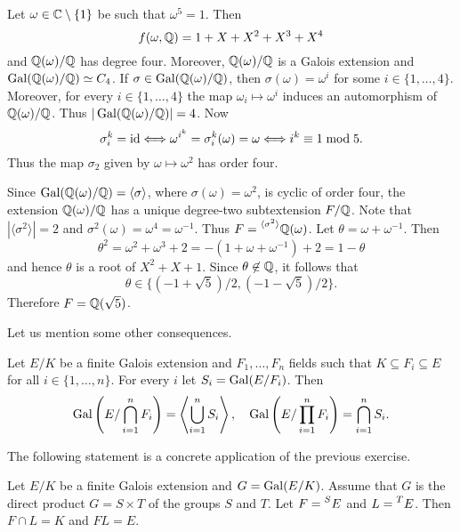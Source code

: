 \begin{example}
    Let $\omega\in\mathbb{C}\setminus\{1\}$ be such that $\omega^5=1$.
    Then 
    \[
    f(\omega,\mathbb{Q})=1+X+X^2+X^3+X^4
    \]
    and $\mathbb{Q}(\omega)/\mathbb{Q}$ has
    degree four. 
    Moreover, $\mathbb{Q}(\omega)/\mathbb{Q}$ is a Galois extension
    and 
    $\operatorname{Gal}(\mathbb{Q}(\omega)/\mathbb{Q})\simeq C_4$. If $\sigma\in \operatorname{Gal}(\mathbb{Q}(\omega)/\mathbb{Q})$,
    then $\sigma(\omega)=\omega^i$ for some $i\in\{1,\dots,4\}$. 
    Moreover, for every $i\in\{1,\dots,4\}$ 
    the map $\omega_i\mapsto\omega^i$ induces an automorphism
    of $\mathbb{Q}(\omega)/\mathbb{Q}$. Thus $|\operatorname{Gal}(\mathbb{Q}(\omega)/\mathbb{Q})|=4$. Now 
    \[
    \sigma_i^k=\operatorname{id}\Longleftrightarrow
    \omega^{i^k}=\sigma_i^k(\omega)=\omega\Longleftrightarrow
    i^k\equiv1\bmod 5.
    \]
    Thus the map $\sigma_2$ given 
    by $\omega\mapsto\omega^2$ has order four. 
    
    Since $\operatorname{Gal}(\mathbb{Q}(\omega)/\mathbb{Q})=\langle\sigma\rangle$,
    where $\sigma(\omega)=\omega^2$, 
    is cyclic of order four, 
    the extension $\mathbb{Q}(\omega)/\mathbb{Q}$ has a unique degree-two 
    subtextension $F/\mathbb{Q}$. Note that $|\langle\sigma^2\rangle|=2$ 
    and $\sigma^2(\omega)=\omega^4=\omega^{-1}$. Thus 
    $F=\prescript{\langle\sigma^2\rangle}{}{\mathbb{Q}(\omega)}$. Let 
    $\theta=\omega+\omega^{-1}$. Then 
    \[
    \theta^2=\omega^2+\omega^3+2=-(1+\omega+\omega^{-1})+2=1-\theta
    \]
    and hence $\theta$ is a root of $X^2+X+1$. Since $\theta\not\in\mathbb{Q}$, 
    it follows that 
    \[
    \theta\in\{(-1+\sqrt{5})/2,(-1-\sqrt{5})/2\}.
    \]
    Therefore
    $F=\mathbb{Q}(\sqrt{5})$. 
\end{example}

Let us mention some other consequences.

\begin{exercise}
    Let $E/K$ be a finite Galois extension 
    and $F_1,\dots,F_n$ fields 
    such that $K\subseteq F_i\subseteq E$ for 
    all $i\in\{1,\dots,n\}$. For every 
    $i$ let $S_i=\operatorname{Gal}(E/F_i)$. Then
    \[
    \operatorname{Gal}\left(E/\bigcap_{i=1}^nF_i\right)=\left\langle\bigcup_{i=1}^nS_i\right\rangle,
    \quad
    \operatorname{Gal}\left(E/\prod_{i=1}^nF_i\right)=\bigcap_{i=1}^nS_i.
    \]
\end{exercise}

The following statement is a concrete application of the 
previous exercise.

\begin{exercise}
    Let $E/K$ be a finite Galois extension and $G=\operatorname{Gal}(E/K)$.
    Assume that $G$ is the direct product
    $G=S\times T$
    of the groups $S$ and $T$. Let 
    $F=\prescript{S}{}{E}$ and
    $L=\prescript{T}{}{E}$. Then $F\cap L=K$ and $FL=E$.
\end{exercise}

